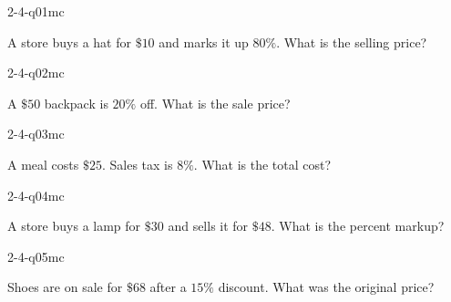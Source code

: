 

\begin{practiceQuestion}{2-4-q01}{mc}
\begin{questionText}
A store buys a hat for $\$10$ and marks it up $80\%$. What is the selling price?
\end{questionText}
\end{practiceQuestion}

\begin{practiceQuestion}{2-4-q02}{mc}
\begin{questionText}
A $\$50$ backpack is $20\%$ off. What is the sale price?
\end{questionText}
\end{practiceQuestion}

\begin{practiceQuestion}{2-4-q03}{mc}
\begin{questionText}
A meal costs $\$25$. Sales tax is $8\%$. What is the total cost?
\end{questionText}
\end{practiceQuestion}

\begin{practiceQuestion}{2-4-q04}{mc}
\begin{questionText}
A store buys a lamp for $\$30$ and sells it for $\$48$. What is the percent markup?
\end{questionText}
\end{practiceQuestion}

\begin{practiceQuestion}{2-4-q05}{mc}
\begin{questionText}
Shoes are on sale for $\$68$ after a $15\%$ discount. What was the original price?
\end{questionText}
\end{practiceQuestion}

